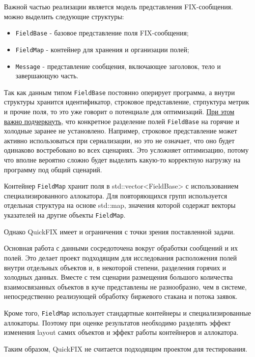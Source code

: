 \documentclass[a4paper,12pt]{article}
\begin{document}
Важной частью реализации является модель представления FIX-сообщения.
можно выделить следующие структуры:

\begin{itemize}
    \item \texttt{FieldBase} - базовое представление поля FIX-сообщения;
    \item \texttt{FieldMap} - контейнер для хранения и организации полей;
    \item \texttt{Message} - представление сообщения, включающее заголовок,
    тело и завершающую часть.
\end{itemize}

Так как данным типом \texttt{FieldBase} постоянно оперирует программа, 
а внутри структуры хранится
идентификатор, строковое представление, стрпуктура метрик и прочие поля, то это
уже говорит о потенциале для оптимизаций. \underline{При этом важно подчеркнуть}, 
что конкретное разделение полей
\texttt{FieldBase} на горячие и холодные заранее не установлено. Например,
строковое представление может активно использоваться при сериализации,
но это не означает, что оно будет одинаково востребовано во всех сценариях. Это
усложняет оптимизацию, потому что вполне вероятно сложно будет выделить какую-то
корректную нагрузку на программу под общий сценарий.

Контейнер \texttt{FieldMap} хранит поля в
std::vector<FieldBase> с использованием специализированного
аллокатора. Для повторяющихся групп используется отдельная структура
на основе std::map, значения которой содержат векторы указателей
на другие объекты \texttt{FieldMap}.

Однако QuickFIX имеет и ограничения с точки зрения поставленной задачи.

Основная работа с данными сосредоточена вокруг обработки сообщений и их
полей. Это делает проект подходящим для исследования расположения полей
внутри отдельных объектов и, в некоторой степени, разделения горячих и
холодных данных. Вместе с тем сценарии размещения большого количества
взаимосвязанных объектов в куче представлены не разнообразно, чем
в системе, непосредственно реализующей обработку биржевого стакана
и потока заявок.

Кроме того, \texttt{FieldMap} использует стандартные контейнеры и
специализированные аллокаторы. Поэтому при оценке результатов необходимо
разделять эффект изменения layout самих объектов и эффект работы
контейнеров и аллокатора.

Таким образом, QuickFIX не считается подходящим проектом для тестирования.
\end{document}
